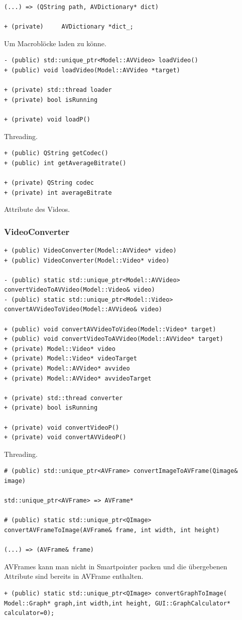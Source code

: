 \documentclass{scrartcl}
\begin{document}
{\begin{verbatim}
(...) => (QString path, AVDictionary* dict)

+ (private) 	AVDictionary *dict_;
\end{verbatim}
Um Macroblöcke laden zu könne.
\bigskip
\begin{verbatim}
- (public) std::unique_ptr<Model::AVVideo> loadVideo()
+ (public) void loadVideo(Model::AVVideo *target)

+ (private) std::thread loader
+ (private) bool isRunning

+ (private) void loadP()
\end{verbatim}
Threading.
\bigskip
\begin{verbatim}
+ (public) QString getCodec()
+ (public) int getAverageBitrate()

+ (private) QString codec
+ (private) int averageBitrate
\end{verbatim}
Attribute des Videos.
\newpage
\subsubsection{VideoConverter}
\bigskip
\begin{verbatim}
+ (public) VideoConverter(Model::AVVideo* video)
+ (public) VideoConverter(Model::Video* video)

- (public) static std::unique_ptr<Model::AVVideo> 
convertVideoToAVVideo(Model::Video& video)
- (public) static std::unique_ptr<Model::Video> 
convertAVVideoToVideo(Model::AVVideo& video)

+ (public) void convertAVVideoToVideo(Model::Video* target)
+ (public) void convertVideoToAVVideo(Model::AVVideo* target)
+ (private) Model::Video* video
+ (private) Model::Video* videoTarget
+ (private) Model::AVVideo* avvideo
+ (private) Model::AVVideo* avvideoTarget

+ (private) std::thread converter
+ (private) bool isRunning

+ (private) void convertVideoP()
+ (private) void convertAVVideoP()
\end{verbatim}
Threading.
\bigskip
\begin{verbatim}
# (public) std::unique_ptr<AVFrame> convertImageToAVFrame(Qimage& image)

std::unique_ptr<AVFrame> => AVFrame*

# (public) static std::unique_ptr<QImage> convertAVFrameToImage(AVFrame& frame, int width, int height)

(...) => (AVFrame& frame)
\end{verbatim}
AVFrames kann man nicht in Smartpointer packen und die übergebenen Attribute sind bereits in AVFrame enthalten.
\bigskip
\begin{verbatim}
+ (public) static std::unique_ptr<QImage> convertGraphToImage(
Model::Graph* graph,int width,int height, GUI::GraphCalculator* calculator=0);


\end{verbatim}}
\end{document}
